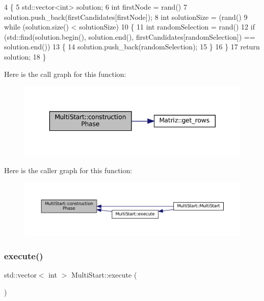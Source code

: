 \begin{DoxyCode}
4 \{
5   std::vector<int> solution;
6   \textcolor{keywordtype}{int} firstNode = rand() %
7   solution.push\_back(firstCandidates[firstNode]);
8   \textcolor{keywordtype}{int} solutionSize = (rand() %
9   \textcolor{keywordflow}{while} (solution.size() < solutionSize)
10   \{
11     \textcolor{keywordtype}{int} randomSelection = rand() %
12     \textcolor{keywordflow}{if} (std::find(solution.begin(), solution.end(), firstCandidates[randomSelection]) == solution.end())
13     \{
14       solution.push\_back(randomSelection);
15     \}
16   \}
17   \textcolor{keywordflow}{return} solution;
18 \}
\end{DoxyCode}
Here is the call graph for this function\+:\nopagebreak
\begin{figure}[H]
\begin{center}
\leavevmode
\includegraphics[width=343pt]{classMultiStart_a29c5796648ede3e6c7fe8ca8043f8187_cgraph}
\end{center}
\end{figure}
Here is the caller graph for this function\+:\nopagebreak
\begin{figure}[H]
\begin{center}
\leavevmode
\includegraphics[width=350pt]{classMultiStart_a29c5796648ede3e6c7fe8ca8043f8187_icgraph}
\end{center}
\end{figure}
\mbox{\label{classMultiStart_a9d842b1f602c4b8a47bf6d88d483ccae}} 
\subsubsection{\texorpdfstring{execute()}{execute()}}
{\footnotesize\ttfamily std\+::vector$<$ int $>$ Multi\+Start\+::execute (\begin{DoxyParamCaption}{ }\end{DoxyParamCaption})\hspace{0.3cm}{\ttfamily [virtual]}}



